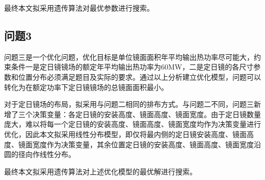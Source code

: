 最终本文拟采用遗传算法对最优参数进行搜索。
\subsection{问题3}
问题三是一个优化问题，优化目标是单位镜面面积年平均输出热功率尽可能大，约束条件一是定日镜镜场的额定年平均输出热功率为60MW，二是定日镜的各尺寸参数和位置分布必须满足题目及实际的要求。通过以上分析建立优化模型，问题可以转化为在额定功率下定日镜镜场的总镜面面积最小。

对于定日镜场的布局，拟采用与问题二相同的排布方式。与问题二不同，问题三新增了三个决策变量：各定日镜的安装高度、镜面高度、镜面宽度。由于定日镜数量庞大，难以将每一个定日镜的安装高度、镜面高度、镜面宽度均作为决策变量进行优化，因此本文拟采用线性分布模型，即仅将最内侧的定日镜安装高度、镜面高度、镜面宽度作为决策变量，其余位置定日镜的安装高度、镜面高度、镜面宽度沿圆的径向作线性分布。

最终本文拟采用遗传算法对上述优化模型的最优解进行搜索。
